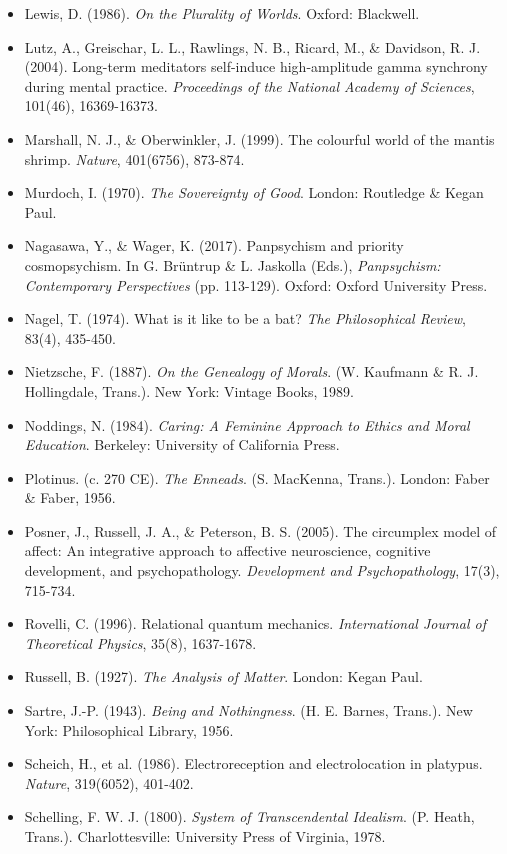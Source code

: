 \begin{itemize}[nosep,leftmargin=*]
  \item Lewis, D. (1986). \textit{On the Plurality of Worlds}. Oxford: Blackwell.
  \item Lutz, A., Greischar, L. L., Rawlings, N. B., Ricard, M., \& Davidson, R. J. (2004). Long-term meditators self-induce high-amplitude gamma synchrony during mental practice. \textit{Proceedings of the National Academy of Sciences}, 101(46), 16369-16373.
  \item Marshall, N. J., \& Oberwinkler, J. (1999). The colourful world of the mantis shrimp. \textit{Nature}, 401(6756), 873-874.
  \item Murdoch, I. (1970). \textit{The Sovereignty of Good}. London: Routledge \& Kegan Paul.
  \item Nagasawa, Y., \& Wager, K. (2017). Panpsychism and priority cosmopsychism. In G. Brüntrup \& L. Jaskolla (Eds.), \textit{Panpsychism: Contemporary Perspectives} (pp. 113-129). Oxford: Oxford University Press.
  \item Nagel, T. (1974). What is it like to be a bat? \textit{The Philosophical Review}, 83(4), 435-450.
  \item Nietzsche, F. (1887). \textit{On the Genealogy of Morals}. (W. Kaufmann \& R. J. Hollingdale, Trans.). New York: Vintage Books, 1989.
  \item Noddings, N. (1984). \textit{Caring: A Feminine Approach to Ethics and Moral Education}. Berkeley: University of California Press.
  \item Plotinus. (c. 270 CE). \textit{The Enneads}. (S. MacKenna, Trans.). London: Faber \& Faber, 1956.
  \item Posner, J., Russell, J. A., \& Peterson, B. S. (2005). The circumplex model of affect: An integrative approach to affective neuroscience, cognitive development, and psychopathology. \textit{Development and Psychopathology}, 17(3), 715-734.
  \item Rovelli, C. (1996). Relational quantum mechanics. \textit{International Journal of Theoretical Physics}, 35(8), 1637-1678.
  \item Russell, B. (1927). \textit{The Analysis of Matter}. London: Kegan Paul.
  \item Sartre, J.-P. (1943). \textit{Being and Nothingness}. (H. E. Barnes, Trans.). New York: Philosophical Library, 1956.
  \item Scheich, H., et al. (1986). Electroreception and electrolocation in platypus. \textit{Nature}, 319(6052), 401-402.
  \item Schelling, F. W. J. (1800). \textit{System of Transcendental Idealism}. (P. Heath, Trans.). Charlottesville: University Press of Virginia, 1978.

\end{itemize}
